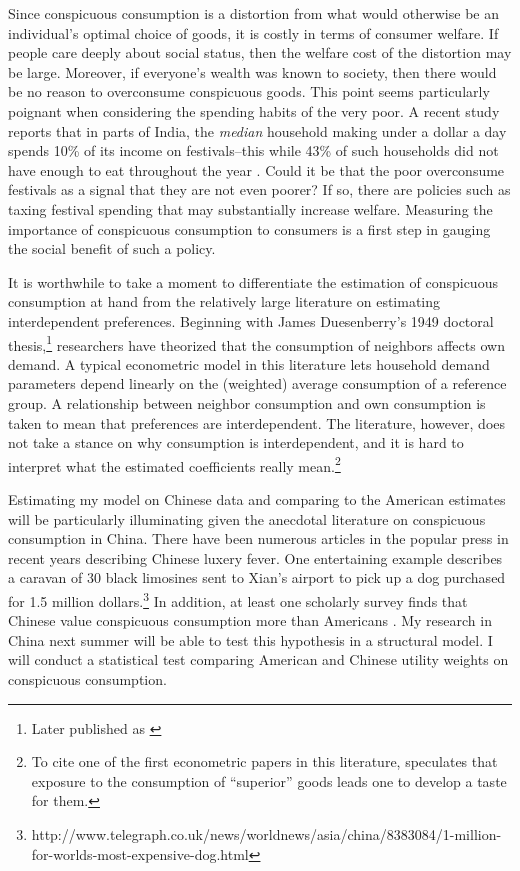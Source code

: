 \documentclass[a4paper,10pt]{article}
\begin{document}
Since conspicuous consumption is a distortion from what would otherwise be an individual's optimal choice of goods, it is costly in terms of consumer welfare.  If people care deeply about social status, then the welfare cost of the distortion may be large.  Moreover, if everyone's wealth was known to society, then there would be no reason to overconsume conspicuous goods.  This point seems particularly poignant when considering the spending habits of the very poor.  A recent study reports that in parts of India, the \emph{median} household making under a dollar a day spends 10\% of its income on festivals--this while 43\% of such households did not have enough to eat throughout the year \citep{BanerjeeDuflo2007}.  Could it be that the poor overconsume festivals as a signal that they are not even poorer?  If so, there are policies such as taxing festival spending that may substantially increase welfare.  Measuring the importance of conspicuous consumption to consumers is a first step in gauging the social benefit of such a policy.

It is worthwhile to take a moment to differentiate the estimation of conspicuous consumption at hand from the relatively large literature on estimating interdependent preferences.  Beginning with James Duesenberry's 1949 doctoral thesis,\footnote{Later published as \citep{Duesenberry1949}} researchers have theorized that the consumption of neighbors affects own demand.  A typical econometric model in this literature lets household demand parameters depend linearly on the (weighted) average consumption of a reference group. A relationship between neighbor consumption and own consumption is taken to mean that preferences are interdependent.  The literature, however, does not take a stance on why consumption is interdependent, and it is hard to interpret what the estimated coefficients really mean.\footnote{To cite one of the first econometric papers in this literature, \citet{Pollak1976} speculates that exposure to the consumption of ``superior'' goods leads one to develop a taste for them.}  

Estimating my model on Chinese data and comparing to the American estimates will be particularly illuminating given the anecdotal literature on conspicuous consumption in China.  There have been numerous articles in the popular press in recent years describing Chinese luxery fever.  One entertaining example describes a caravan of 30 black limosines sent to Xian's airport to pick up a dog purchased for 1.5 million dollars.\footnote{http://www.telegraph.co.uk/news/worldnews/asia/china/8383084/1-million-for-worlds-most-expensive-dog.html}  In addition, at least one scholarly survey finds that Chinese value conspicuous consumption more than Americans \citep{Podoshenetal2010}.  My research in China next summer will be able to test this hypothesis in a structural model.  I will conduct a statistical test comparing American and Chinese utility weights on conspicuous consumption.          
\end{document}

